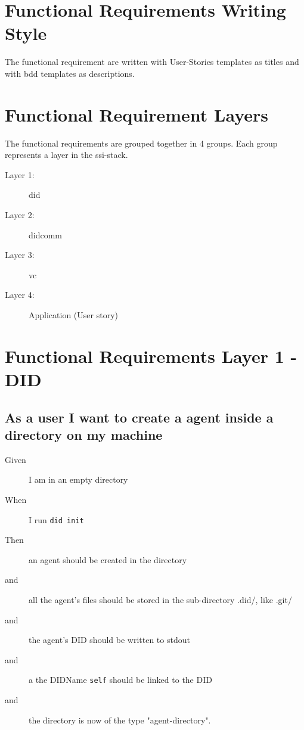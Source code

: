\newpage

\section{Functional Requirements Writing Style}

The functional requirement are written with User-Stories templates as titles and with \acrfull{bdd} templates as descriptions.


\section{Functional Requirement Layers}

The functional requirements are grouped together in 4 groups. Each group represents a layer in the \acrshort{ssi}-stack.
\begin{description}
    \item[Layer 1:] \acrfull{did}
    \item[Layer 2:] \acrfull{didcomm}
    \item[Layer 3:] \acrfull{vc}
    \item[Layer 4:] Application (User story)
\end{description}


\newpage

\section{Functional Requirements Layer 1 - DID}


\subsection{As a user I want to create a agent inside a directory on my machine}
\begin{description}
    \item[Given] I am in an empty directory
    \item[When] I run \texttt{did init}
    \item[Then] an agent should be created in the directory
    \item[and] all the agent's files should be stored in the sub-directory .did/, like .git/
    \item[and] the agent's DID should be written to stdout 
    \item[and] a the DIDName \texttt{self} should be linked to the DID
    \item[and] the directory is now of the type "agent-directory".
\end{description}


